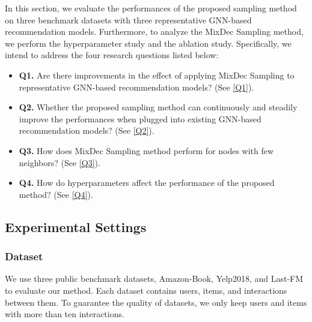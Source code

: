 In this section,  we evaluate the performances of the proposed sampling method on three benchmark datasets with three representative GNN-based recommendation models. Furthermore, to analyze the MixDec Sampling method, we perform the hyperparameter study and the ablation study. Specifically, we intend to address the four research questions listed below:
\begin{itemize}
    \item \textbf{Q1.} Are there improvements in the effect of applying MixDec Sampling to representative GNN-based recommendation models? (See \ref{Q1}).
    \item \textbf{Q2.} Whether the proposed sampling method can continuously and steadily improve the performances when plugged
into existing GNN-based recommendation models? (See \ref{Q2}).
    \item \textbf{Q3.} How does MixDec Sampling method perform for nodes with few neighbors? (See \ref{Q3}).
    \item \textbf{Q4.} How do hyperparameters affect the performance of the proposed method? (See \ref{Q4}).
\end{itemize}
\subsection{Experimental Settings}
\subsubsection{\textbf{Dataset}}
We use three public benchmark datasets, Amazon-Book, Yelp2018, and Last-FM to evaluate our method.
Each dataset contains users, items, and interactions between them. To guarantee the quality of datasets, we only keep users and items with more than ten interactions.

\begin{table}[t]
\centering
\renewcommand\arraystretch{2} 
\caption{Statistics of the datasets.}
\label{tab:dataset}
\end{table}


